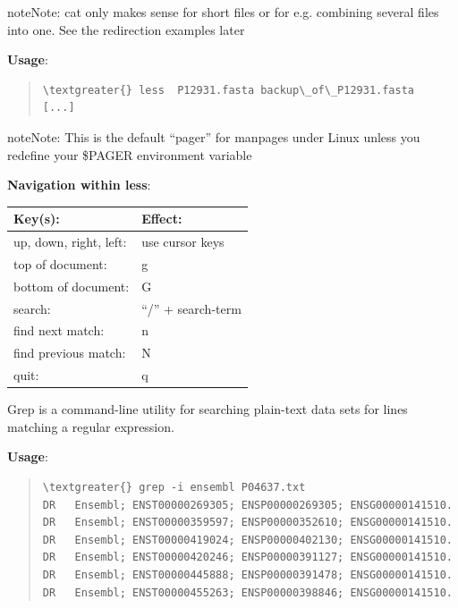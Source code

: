 \documentclass[letterpaper,10pt,english]{sphinxmanual}
\begin{document}
\begin{notice}{note}{Note:}
cat only makes sense for short files or for e.g. combining several files into one.  See the redirection examples later
\end{notice}

\textbf{Usage}:  
\begin{quote}

\begin{Verbatim}[commandchars=\\\{\}]
\textgreater{} less  P12931.fasta backup\_of\_P12931.fasta
[...]
\end{Verbatim}
\end{quote}

\begin{notice}{note}{Note:}
This is the default “pager” for manpages under Linux unless you redefine your \$PAGER environment variable
\end{notice}

\textbf{Navigation within less}:

\begin{tabulary}{\linewidth}{|L|L|}
\hline
\textsf{\relax 
Key(s):
} & \textsf{\relax 
Effect:
}\\
\hline
up, down, right, left:
 & 
use cursor keys
\\

top of document:
 & 
g
\\

bottom of document:
 & 
G
\\

search:
 & 
“/” + search-term
\\

find next match:
 & 
n
\\

find previous match:
 & 
N
\\

quit:
 & 
q
\\
\hline\end{tabulary}


Grep is a command-line utility for searching plain-text data sets for lines matching a regular expression.

\textbf{Usage}:  
\begin{quote}

\begin{Verbatim}[commandchars=\\\{\}]
\textgreater{} grep -i ensembl P04637.txt
DR   Ensembl; ENST00000269305; ENSP00000269305; ENSG00000141510.
DR   Ensembl; ENST00000359597; ENSP00000352610; ENSG00000141510.
DR   Ensembl; ENST00000419024; ENSP00000402130; ENSG00000141510.
DR   Ensembl; ENST00000420246; ENSP00000391127; ENSG00000141510.
DR   Ensembl; ENST00000445888; ENSP00000391478; ENSG00000141510.
DR   Ensembl; ENST00000455263; ENSP00000398846; ENSG00000141510.
\end{Verbatim}
\end{quote}
\end{document}
